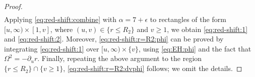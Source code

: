 \documentclass[12 pt, reqno]{amsart}
\theoremstyle{definition}
\theoremstyle{remark}
\numberwithin{equation}{section}
\newcommand{\set}[1]{\{#1\}}
\newcommand{\rd}{\partial}
\newcommand{\bb}{\Big}
\newcommand{\0}{\emptyset}
\newcommand{\alp}{\alpha}
\newcommand{\eps}{\epsilon}
\newcommand{\lmb}{\lambda}
\newcommand{\Omg}{\Omega}
\newcommand{\dur}{\nu}
\newcommand{\dvr}{\lmb}
\begin{document}
\begin{proof}
\begin{equation}
\begin{aligned}
\end{aligned}
\end{equation}
Applying \eqref{eq:red-shift:combine} with $\alp = 7 + \eps$ to rectangles of the form $[u, \infty) \times [1, v]$, where $(u, v) \in \set{r \leq R_{2}}$ and $v \geq 1$, we obtain \eqref{eq:red-shift:1} and \eqref{eq:red-shift:2}. Moreover, \eqref{eq:red-shift:r=R2:phi} can be proved by integrating \eqref{eq:red-shift:1} over $[u, \infty) \times \set{v}$, using \eqref{eq:EH:phi} and the fact that $\Omg^{2} = - \rd_{u} r$. Finally, repeating the above argument to the region $\set{r \leq R_{2}} \cap \set{v \geq 1}$, \eqref{eq:red-shift:r=R2:dvphi} follows; we omit the details. \qedhere


\end{proof}
\end{document}
